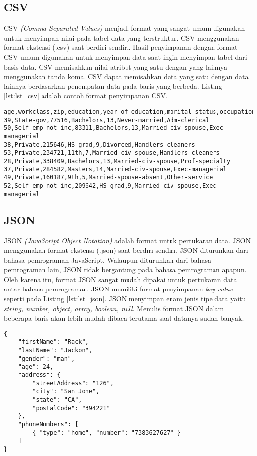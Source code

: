 \subsection{CSV}
CSV \textit{(Comma Separated Values)} menjadi format yang sangat umum digunakan untuk menyimpan nilai pada tabel data yang terstruktur. CSV menggunakan format ekstensi (.csv) saat berdiri sendiri. Hasil penyimpanan dengan format CSV umum digunakan untuk menyimpan data saat ingin menyimpan tabel dari basis data. CSV memisahkan nilai atribut yang satu dengan yang lainnya menggunakan tanda koma. CSV dapat memisahkan data yang satu dengan data lainnya berdasarkan penempatan data pada baris yang berbeda. Listing \ref{lst:lst_csv} adalah contoh format penyimpanan CSV.

\begin{lstlisting}[basicstyle=\ttfamily, frame=single,
	columns=fullflexible, keepspaces=true, breaklines=true, label=lst:lst_csv, caption=Format Penyimpanan CSV]
age,workclass,zip,education,year_of_education,marital_status,occupation
39,State-gov,77516,Bachelors,13,Never-married,Adm-clerical
50,Self-emp-not-inc,83311,Bachelors,13,Married-civ-spouse,Exec-managerial
38,Private,215646,HS-grad,9,Divorced,Handlers-cleaners
53,Private,234721,11th,7,Married-civ-spouse,Handlers-cleaners
28,Private,338409,Bachelors,13,Married-civ-spouse,Prof-specialty
37,Private,284582,Masters,14,Married-civ-spouse,Exec-managerial
49,Private,160187,9th,5,Married-spouse-absent,Other-service
52,Self-emp-not-inc,209642,HS-grad,9,Married-civ-spouse,Exec-managerial
\end{lstlisting}

\subsection{JSON}
JSON \textit{(JavaScript Object Notation)} adalah format untuk pertukaran data. JSON menggunakan format ekstensi (.json) saat berdiri sendiri. JSON diturunkan dari bahasa pemrograman JavaScript. Walaupun diturunkan dari bahasa pemrograman lain, JSON tidak bergantung pada bahasa pemrograman apapun. Oleh karena itu, format JSON sangat mudah dipakai untuk pertukaran data antar bahasa pemrograman. JSON memiliki format penyimpanan \textit{key-value} seperti pada Listing \ref{lst:lst_json}. JSON menyimpan enam jenis tipe data yaitu \textit{string, number, object, array, boolean, null}. Menulis format JSON dalam beberapa baris akan lebih mudah dibaca terutama saat datanya sudah banyak. 

\begin{lstlisting}[basicstyle=\ttfamily, frame=single,
	columns=fullflexible, keepspaces=true, breaklines=true, label=lst:lst_json, caption=Format Penyimpanan JSON]
{
    "firstName": "Rack",
    "lastName": "Jackon",
    "gender": "man",
    "age": 24,
    "address": {
        "streetAddress": "126",
        "city": "San Jone",
        "state": "CA",
        "postalCode": "394221"
    },
    "phoneNumbers": [
        { "type": "home", "number": "7383627627" }
    ]
}
\end{lstlisting}








